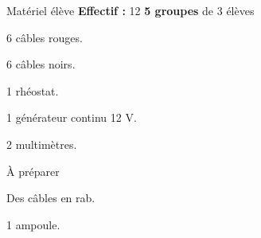 
\begin{boiteMateriel}{Matériel élève}
  \textbf{Effectif :} 12
  \qq{}\qq{}
  \flecheLongue \textbf{5 groupes} de 3 élèves

  \begin{protocole}
    \item 6 câbles rouges.
    \item 6 câbles noirs.
    \item 1 rhéostat.
    \item 1 générateur continu 12 V.
    \item 2 multimètres.
  \end{protocole}
\end{boiteMateriel}


\begin{boiteMateriel}{À préparer}
  \begin{protocole}
    \item Des câbles en rab.
    \item 1 ampoule.
  \end{protocole}
\end{boiteMateriel}